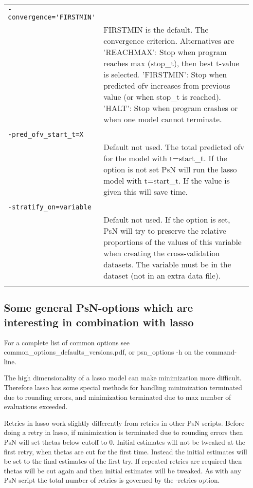 \documentclass[a4paper,12pt]{article}
\begin{document}
\begin{longtable}{p{1in}p{4in}}
\verb|-convergence='FIRSTMIN'| & \\
\nopagebreak
 & FIRSTMIN is the default. The convergence criterion. Alternatives are 'REACHMAX': Stop when program reaches max (stop\_t), then best t-value is selected. 'FIRSTMIN': Stop when predicted ofv increases from previous value (or when stop\_t is reached). 'HALT': Stop when program crashes or when one model cannot terminate. \\
\\
\verb|-pred_ofv_start_t=X| & \\
\nopagebreak
 & Default not used. The total predicted ofv for the model with t=start\_t.  If the option is not set PsN will run the lasso model with t=start\_t. If the value is given this will save time. \\
\\
\verb|-stratify_on=variable| & \\
\nopagebreak
 & Default not used. If the option is set, PsN will try to preserve the relative proportions of the values of this variable when creating the cross-validation datasets. The variable must be in the dataset (not in an extra data file). \\
\\
\end{longtable}

\subsection{Some general PsN-options which are interesting in combination with lasso}

For a complete list of common options see common\_options\_defaults\_versions.pdf, or psn\_options -h on the command-line.

The high dimensionality of a lasso model can make minimization more difficult. Therefore lasso has some special methods for handling minimization terminated due to rounding errors, and minimization terminated due to max number of evaluations exceeded.

Retries in lasso work slightly differently from retries in other PsN scripts. Before doing a retry in lasso, if minimization is terminated due to rounding errors then PsN will set thetas below cutoff to 0. Initial estimates will not be tweaked at the first retry, when thetas are cut for the first time. Instead the initial estimates will be set to the final estimates of the first try. If repeated retries are required then thetas will be cut again and then initial estimates will be tweaked. As with any PsN script the total number of retries is governed by the -retries option. 
\end{document}
